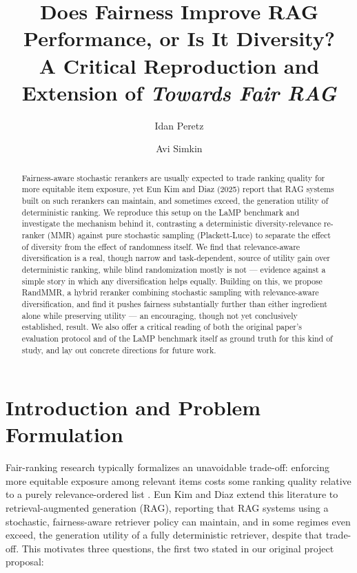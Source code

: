 \documentclass[10pt,twocolumn]{article}
\title{\vspace{-1.2em}Does Fairness Improve RAG Performance, or Is It Diversity?\\
\large A Critical Reproduction and Extension of \emph{Towards Fair RAG}\vspace{-0.3em}}
\author[1]{Idan Peretz}
\author[1]{Avi Simkin}
\affil[1]{\normalsize \{308560150, 312485816\}}
\date{}
\begin{document}
\maketitle
\vspace{-2.2em}

\begin{abstract}
\noindent
Fairness-aware stochastic rerankers are usually expected to trade ranking quality for
more equitable item exposure, yet Eun Kim and Diaz (2025) report that RAG systems
built on such rerankers can maintain, and sometimes exceed, the generation utility of
deterministic ranking. We reproduce this setup on the LaMP benchmark and investigate
the mechanism behind it, contrasting a deterministic diversity-relevance re-ranker
(MMR) against pure stochastic sampling (Plackett-Luce) to separate the effect of
diversity from the effect of randomness itself. We find that relevance-aware
diversification is a real, though narrow and task-dependent, source of utility gain
over deterministic ranking, while blind randomization mostly is not --- evidence
against a simple story in which any diversification helps equally. Building on this,
we propose RandMMR, a hybrid reranker combining stochastic sampling with
relevance-aware diversification, and find it pushes fairness substantially further
than either ingredient alone while preserving utility --- an encouraging, though not
yet conclusively established, result. We also offer a critical reading of both the
original paper's evaluation protocol and of the LaMP benchmark itself as ground truth
for this kind of study, and lay out concrete directions for future work.
\end{abstract}

\vspace{0.3em}

\section{Introduction and Problem Formulation}
\label{sec:intro}

Fair-ranking research typically formalizes an unavoidable trade-off: enforcing more
equitable exposure among relevant items costs some ranking quality relative to a
purely relevance-ordered list \cite{castillo2018fairness,diaz2020evaluating}.
Eun Kim and Diaz \cite{eunkim2025fairrag} extend this literature to
retrieval-augmented generation (RAG), reporting that RAG systems using a stochastic,
fairness-aware retriever policy can maintain, and in some regimes even exceed, the
generation utility of a fully deterministic retriever, despite that trade-off. This
motivates three questions, the first two stated in our original project proposal:
\end{document}
